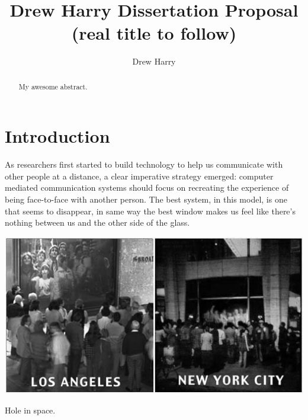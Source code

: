 \documentclass{tufte-handout}
\title{Drew Harry Dissertation Proposal (real title to follow)}
\author[Drew Harry]{Drew Harry}
\begin{document}
\maketitle%

\begin{abstract}
\noindent My awesome abstract.
\end{abstract}



\section{Introduction}\label{sec:introduction}





As researchers first started to build technology to help us communicate with other people at a distance, a clear imperative strategy emerged: computer mediated communication systems should focus on recreating the experience of being face-to-face with another person. The best system, in this model, is one that seems to disappear, in same way the best window makes us feel like there's nothing between us and the other side of the glass.

\begin{marginfigure}
	\includegraphics{figures/hole_in_space.jpg}
	\caption{Hole in space.}
	\label{fig:hole-in-space}
\end{marginfigure}
\end{document}

